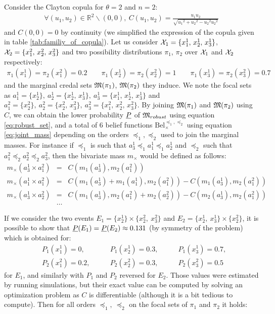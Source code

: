\begin{example}
Consider the Clayton copula for $\theta=2$ and $n=2$:
\begin{eqnarray*}
    \forall (u_1,u_2)\in\mathbb{R}^2\backslash(0,0), ~C(u_1,u_2)=\frac{u_1u_2}{\sqrt{{u_1}^2+{u_2}^2-{u_2}^2{u_2}^2}}
\end{eqnarray*}
and $C(0,0)=0$ by continuity (we simplified the expression of the copula given in table \ref{tab:familiy_of_copula}). Let us consider ${\mathcal{X}}_1=\{x^1_1,\, x^1_2,\, x^1_3\}$, ${\mathcal{X}}_2=\{x^2_1,\, x^2_2,\, x^2_3\}$ and two possibility distributions $\pi_1$, $\pi_2$ over ${\mathcal{X}}_1$ and ${\mathcal{X}}_2$ respectively:
\begin{eqnarray*}
    \pi_1(x^1_1)=\pi_2(x^2_1)=0.2 \qquad \pi_1(x^1_2)=\pi_2(x^2_2)=1 \qquad \pi_1(x^1_3)=\pi_2(x^2_3)=0.7 
\end{eqnarray*}
and the marginal credal sets ${\mathfrak{M}}(\pi_1)$, ${\mathfrak{M}}(\pi_2)$ they induce. We note the focal sets as $a^1_1=\{x^1_2\},~a^1_2=\{x^1_2,\, x^1_3\},~a^1_3=\{x^1_1,\,x^1_2,\,x^1_3\}$ and $a^2_1=\{x^2_2\},~a^2_2=\{x^2_2,\, x^2_3\},~a^2_3=\{x^2_1,\, x^2_2,\, x^2_3\}$. By joining ${\mathfrak{M}}(\pi_1)$ and ${\mathfrak{M}}(\pi_2)$ using $C$, we can obtain the lower probability ${\underline{P}}$ of ${\mathfrak{M}}_{robust}$ using equation \ref{eq:robust_set}, and a total of 6 belief functions $\mathrm{Bel}^{\preceq_1,\preceq_2}_\times$ using equation \ref{eq:joint_mass} depending on the orders $\preceq_1, \preceq_2$ used to join the marginal masses. For instance if $\preceq_1$ is such that $a^1_3\preceq_1 a^1_1 \preceq_1 a^1_2$ and $\preceq_2$ such that $a^2_1 \preceq_2 a^2_2 \preceq_2 a^2_3$, then the bivariate mass $m_\times$ would be defined as follows:
\begin{eqnarray*}
    m_\times(a^1_3\times a^2_1) &=& C(m_1(a^1_3), m_2(a^2_1))\\
    m_\times(a^1_1\times a^2_1) &=& C(m_1(a^1_3)+m_1(a^1_1), m_2(a^2_1)) - C(m_1(a^1_3), m_2(a^2_1))\\
    m_\times(a^1_3\times a^2_2) &=& C(m_1(a^1_3), m_2(a^2_1) + m_2(a^2_2)) - C(m_2(a^1_3), m_2(a^2_1))\\
    &\dots&
\end{eqnarray*}

If we consider the two events $E_1=\{x^1_2\}\times\{x^2_2,~x^2_3\}$ and $E_2=\{x^1_2,~x^1_3\}\times\{x^2_2\}$, it is possible to show that ${\underline{P}}(E_1)={\underline{P}}(E_2)\approx0.131$ (by symmetry of the problem) which is obtained for:
\begin{align*}
    &P_1(x^1_1)=0, \qquad&P_1(x^1_2)=0.3, \qquad&P_1(x^1_3)=0.7,\\
    &P_2(x^2_1)=0.2, \qquad&P_2(x^2_2)=0.3, \qquad&P_2(x^2_3)=0.5
\end{align*}
for $E_1$, and similarly with $P_1$ and $P_2$ reversed for $E_2$. Those values were estimated by running simulations, but their exact value can be computed by solving an optimization problem as $C$ is differentiable (although it is a bit tedious to compute). Then for all orders $\preceq_1,~\preceq_2$ on the focal sets of $\pi_1$ and $\pi_2$ it holds:


\end{example}
